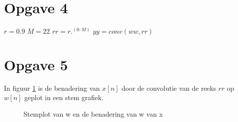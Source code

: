 \documentclass{article}
\begin{document}
\section{Opgave 4}
$r = 0.9$
$M = 22$
$rr = r .^ (0:M)$
$yy = conv(ww, rr)$

\section{Opgave 5}
In figuur \ref{fig:opgave5} is de benadering van $x[n]$ door de convolutie van de reeks $rr$ op $w[n]$ geplot in een stem grafiek.
\begin{figure}[h]
  \centering
  \caption{Stemplot van w en de benadering van w van x}
  \label{fig:opgave5}
\end{figure}
\end{document}
